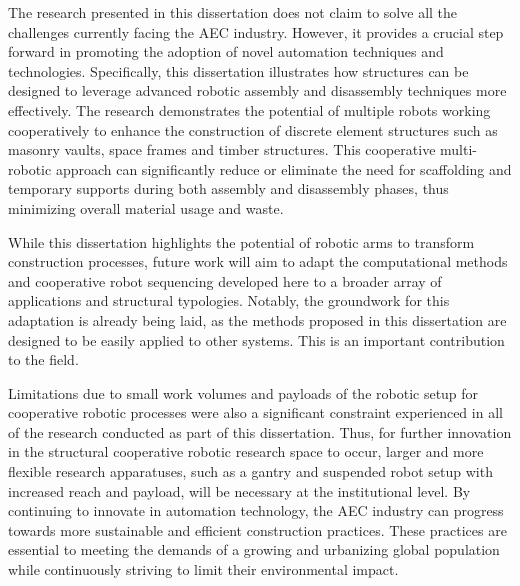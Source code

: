         The research presented in this dissertation does not claim to solve all the challenges currently facing the AEC industry. However, it provides a crucial step forward in promoting the adoption of novel automation techniques and technologies. Specifically, this dissertation illustrates how structures can be designed to leverage advanced robotic assembly and disassembly techniques more effectively. The research demonstrates the potential of multiple robots working cooperatively to enhance the construction of discrete element structures such as masonry vaults, space frames and timber structures. This cooperative multi-robotic approach can significantly reduce or eliminate the need for scaffolding and temporary supports during both assembly and disassembly phases, thus minimizing overall material usage and waste.

        While this dissertation highlights the potential of robotic arms to transform construction processes, future work will aim to adapt the computational methods and cooperative robot sequencing developed here to a broader array of applications and structural typologies. Notably, the groundwork for this adaptation is already being laid, as the methods proposed in this dissertation are designed to be easily applied to other systems. This is an important contribution to the field.
        
        Limitations due to small work volumes and payloads of the robotic setup for cooperative robotic processes were also a significant constraint experienced in all of the research conducted as part of this dissertation. Thus, for further innovation in the structural cooperative robotic research space to occur, larger and more flexible research apparatuses, such as a gantry and suspended robot setup with increased reach and payload, will be necessary at the institutional level. By continuing to innovate in automation technology, the AEC industry can progress towards more sustainable and efficient construction practices. These practices are essential to meeting the demands of a growing and urbanizing global population while continuously striving to limit their environmental impact.
        
\newpage
 

\begingroup
    \hypersetup{hidelinks}
    
\endgroup